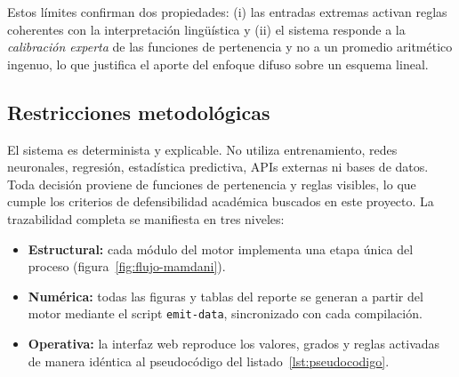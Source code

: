 Estos límites confirman dos propiedades: (i) las entradas extremas activan reglas coherentes con la interpretación lingüística y (ii) el sistema responde a la \emph{calibración experta} de las funciones de pertenencia y no a un promedio aritmético ingenuo, lo que justifica el aporte del enfoque difuso sobre un esquema lineal.

\subsection{Restricciones metodológicas}

El sistema es determinista y explicable. No utiliza entrenamiento, redes neuronales, regresión, estadística predictiva, APIs externas ni bases de datos. Toda decisión proviene de funciones de pertenencia y reglas visibles, lo que cumple los criterios de defensibilidad académica buscados en este proyecto. La trazabilidad completa se manifiesta en tres niveles:

\begin{itemize}
  \item \textbf{Estructural:} cada módulo del motor implementa una etapa única del proceso (figura~\ref{fig:flujo-mamdani}).
  \item \textbf{Numérica:} todas las figuras y tablas del reporte se generan a partir del motor mediante el script \texttt{emit-data}, sincronizado con cada compilación.
  \item \textbf{Operativa:} la interfaz web reproduce los valores, grados y reglas activadas de manera idéntica al pseudocódigo del listado~\ref{lst:pseudocodigo}.
\end{itemize}
